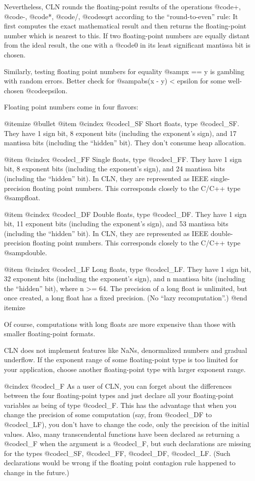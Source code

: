 Nevertheless, CLN rounds the floating-point results of the operations @code{+},
@code{-}, @code{*}, @code{/}, @code{sqrt} according to the ``round-to-even''
rule: It first computes the exact mathematical result and then returns the
floating-point number which is nearest to this. If two floating-point numbers
are equally distant from the ideal result, the one with a @code{0} in its least
significant mantissa bit is chosen.

Similarly, testing floating point numbers for equality @samp{x == y}
is gambling with random errors. Better check for @samp{abs(x - y) < epsilon}
for some well-chosen @code{epsilon}.

Floating point numbers come in four flavors:

@itemize @bullet
@item
@cindex @code{cl_SF}
Short floats, type @code{cl_SF}.
They have 1 sign bit, 8 exponent bits (including the exponent's sign),
and 17 mantissa bits (including the ``hidden'' bit).
They don't consume heap allocation.

@item
@cindex @code{cl_FF}
Single floats, type @code{cl_FF}.
They have 1 sign bit, 8 exponent bits (including the exponent's sign),
and 24 mantissa bits (including the ``hidden'' bit).
In CLN, they are represented as IEEE single-precision floating point numbers.
This corresponds closely to the C/C++ type @samp{float}.

@item
@cindex @code{cl_DF}
Double floats, type @code{cl_DF}.
They have 1 sign bit, 11 exponent bits (including the exponent's sign),
and 53 mantissa bits (including the ``hidden'' bit).
In CLN, they are represented as IEEE double-precision floating point numbers.
This corresponds closely to the C/C++ type @samp{double}.

@item
@cindex @code{cl_LF}
Long floats, type @code{cl_LF}.
They have 1 sign bit, 32 exponent bits (including the exponent's sign),
and n mantissa bits (including the ``hidden'' bit), where n >= 64.
The precision of a long float is unlimited, but once created, a long float
has a fixed precision. (No ``lazy recomputation''.)
@end itemize

Of course, computations with long floats are more expensive than those
with smaller floating-point formats.

CLN does not implement features like NaNs, denormalized numbers and
gradual underflow. If the exponent range of some floating-point type
is too limited for your application, choose another floating-point type
with larger exponent range.

@cindex @code{cl_F}
As a user of CLN, you can forget about the differences between the
four floating-point types and just declare all your floating-point
variables as being of type @code{cl_F}. This has the advantage that
when you change the precision of some computation (say, from @code{cl_DF}
to @code{cl_LF}), you don't have to change the code, only the precision
of the initial values. Also, many transcendental functions have been
declared as returning a @code{cl_F} when the argument is a @code{cl_F},
but such declarations are missing for the types @code{cl_SF}, @code{cl_FF},
@code{cl_DF}, @code{cl_LF}. (Such declarations would be wrong if
the floating point contagion rule happened to change in the future.)


